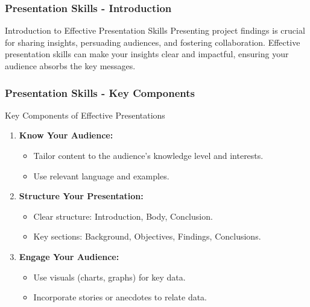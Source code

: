 \documentclass[aspectratio=169]{beamer}
\begin{document}
\begin{frame}[fragile]
  \frametitle{Presentation Skills - Introduction}
  \begin{block}{Introduction to Effective Presentation Skills}
    Presenting project findings is crucial for sharing insights, persuading audiences, and fostering collaboration. Effective presentation skills can make your insights clear and impactful, ensuring your audience absorbs the key messages.
  \end{block}
\end{frame}

\begin{frame}[fragile]
  \frametitle{Presentation Skills - Key Components}
  \begin{block}{Key Components of Effective Presentations}
    \begin{enumerate}
      \item \textbf{Know Your Audience:}
      \begin{itemize}
        \item Tailor content to the audience's knowledge level and interests.
        \item Use relevant language and examples.
      \end{itemize}
      
      \item \textbf{Structure Your Presentation:}
      \begin{itemize}
        \item Clear structure: Introduction, Body, Conclusion.
        \item Key sections: Background, Objectives, Findings, Conclusions.
      \end{itemize}
      
      \item \textbf{Engage Your Audience:}
      \begin{itemize}
        \item Use visuals (charts, graphs) for key data.
        \item Incorporate stories or anecdotes to relate data.
      \end{itemize}
    \end{enumerate}
  \end{block}
\end{frame}
\end{document}
